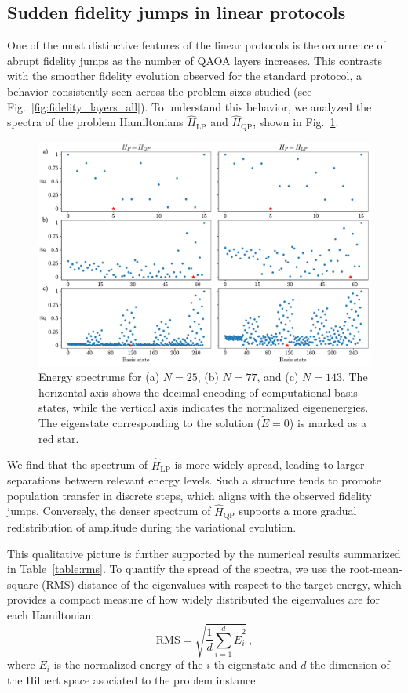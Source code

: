 \subsection*{Sudden fidelity jumps in linear protocols}

One of the most distinctive features of the linear protocols is the occurrence of abrupt fidelity jumps as the number of QAOA layers increases. This contrasts with the smoother fidelity evolution observed for the standard protocol, a behavior consistently seen across the problem sizes studied (see Fig.~\ref{fig:fidelity_layers_all}). To understand this behavior, we analyzed the spectra of the problem Hamiltonians $\hat{H}_\mathrm{LP}$ and $\hat{H}_\mathrm{QP}$, shown in Fig.~\ref{fig:spectrums}.
\begin{figure}[h]
    \centering
    \includegraphics[width=1\textwidth]{05-discussion/figs/energy_spectrums.pdf}
    \caption{Energy spectrums for (a) $N=25$, (b) $N=77$, and (c) $N=143$. The horizontal axis shows the decimal encoding of computational basis states, while the vertical axis indicates the normalized eigenenergies. The eigenstate corresponding to the solution ($\widetilde{E}=0$) is marked as a red star.}
    \label{fig:spectrums}
\end{figure}
We find that the spectrum of $\hat{H}_\mathrm{LP}$ is more widely spread, leading to larger separations between relevant energy levels. Such a structure tends to promote population transfer in discrete steps, which aligns with the observed fidelity jumps. Conversely, the denser spectrum of $\hat{H}_\mathrm{QP}$ supports a more gradual redistribution of amplitude during the variational evolution.

This qualitative picture is further supported by the numerical results summarized in Table~\ref{table:rms}. To quantify the spread of the spectra, we use the root-mean-square (RMS) distance of the eigenvalues with respect to the target energy, which provides a compact measure of how widely distributed the eigenvalues are for each Hamiltonian:
\begin{equation}
    \textrm{RMS} = \sqrt{\dfrac{1}{d} \sum_{i=1}^{d}\widetilde{E}_i^2}\,,
    \label{eq:rms}
\end{equation}
where $\widetilde{E}_i$ is the normalized energy of the $i$-th eigenstate and $d$ the dimension of the Hilbert space asociated to the problem instance.

